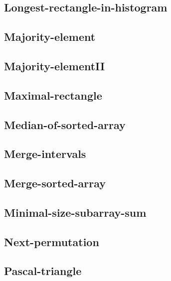 \documentclass[a4paper,10pt]{article}
\begin{document}
\begin{CJK}{UTF8}{gbsn}
\subsection{Longest-rectangle-in-histogram}


\subsection{Majority-element}


\subsection{Majority-elementII}


\subsection{Maximal-rectangle}


\subsection{Median-of-sorted-array}


\subsection{Merge-intervals}


\subsection{Merge-sorted-array}


\subsection{Minimal-size-subarray-sum}


\subsection{Next-permutation}


\subsection{Pascal-triangle}



\end{CJK}
\end{document}
